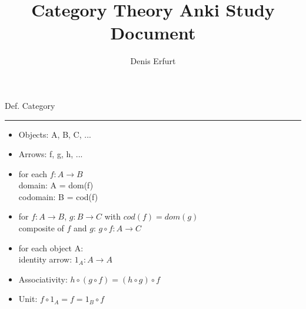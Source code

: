 

\newcommand{\uuid}{}
\newcommand{\localtag}{}
\newcommand{\globaltag}{}
\newcommand{\tags}[1]{
    \ifnote
        \renewcommand{\localtag}{#1}
    \else
        \renewcommand{\globaltag}{#1}
    \fi
    }
    \newif\ifnote
\newenvironment{note}
{\par\medskip\noindent\hspace*{0.3in}
  \tabular{!{\color{blue!40}%
      \vrule width 5pt}p{\dimexpr\linewidth-0.6in-2\tabcolsep-5pt\relax}|}\hline}
{\\\hline\endtabular\par\medskip}
\newenvironment{field}{\center}{\center}
\newcommand{\xplain}[1]{\renewcommand{\uuid}{#1}}


\title{Category Theory Anki Study Document}
\author{Denis Erfurt}
\maketitle
\tags{cat}

\begin{note}
  \xplain{6fd37e54-117f-4f05-be5b-55a0c4dc3441}
  \begin{field}
    Def. Category
  \end{field} \\
  \noindent\rule[0.5ex]{\linewidth}{1pt}
  \begin{field}
    \begin{itemize}
      \item Objects: A, B, C, ...
      \item Arrows: f, g, h, ...
      \item for each $f:A\rightarrow B$ \\
        domain: A = dom(f)\\
        codomain: B = cod(f)
      \item for $f: A \rightarrow B$, $g: B \rightarrow C$ with $cod(f) = dom(g)$\\
        composite of $f$ and $g$: $g\circ f: A\rightarrow C$
      \item for each object A: \\
        identity arrow: $1_A: A\rightarrow A$
      \item Associativity:
          $h\circ(g\circ f) = (h\circ g)\circ f$
      \item Unit: $f\circ 1_A = f = 1_B\circ f$
    \end{itemize}
  \end{field}
\end{note}

